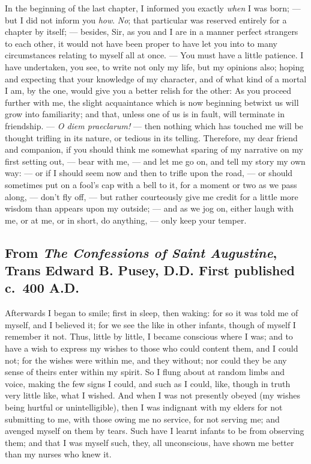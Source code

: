 \documentclass[
]{memoir}
\begin{document}
In the beginning of the last chapter, I informed you exactly \emph{when}
I was born; --- but I did not inform you \emph{how}. \emph{No}; that
particular was reserved entirely for a chapter by itself; --- besides,
Sir, as you and I are in a manner perfect strangers to each other, it
would not have been proper to have let you into to many circumstances
relating to myself all at once. --- You must have a little patience. I
have undertaken, you see, to write not only my life, but my opinions
also; hoping and expecting that your knowledge of my character, and of
what kind of a mortal I am, by the one, would give you a better relish
for the other: As you proceed further with me, the slight acquaintance
which is now beginning betwixt us will grow into familiarity; and that,
unless one of us is in fault, will terminate in friendship. --- \emph{O
diem praeclarum!} --- then nothing which has touched me will be thought
trifling in its nature, or tedious in its telling. Therefore, my dear
friend and companion, if you should think me somewhat sparing of my
narrative on my first setting out, --- bear with me, --- and let me go
on, and tell my story my own way: --- or if I should seem now and then
to trifle upon the road, --- or should sometimes put on a fool's cap
with a bell to it, for a moment or two as we pass along, --- don't fly
off, --- but rather courteously give me credit for a little more wisdom
than appears upon my outside; --- and as we jog on, either laugh with
me, or at me, or in short, do anything, --- only keep your temper.

\hypertarget{from-the-confessions-of-saint-augustine-trans-edward-b.-pusey-d.d.-first-published-c.-400-a.d.}{%
\subsection*{\texorpdfstring{From \emph{The Confessions of Saint
Augustine}, Trans Edward B. Pusey, D.D. First published c.~400
A.D.}{From The Confessions of Saint Augustine, Trans Edward B. Pusey, D.D. First published c.~400 A.D.}}\label{from-the-confessions-of-saint-augustine-trans-edward-b.-pusey-d.d.-first-published-c.-400-a.d.}}

Afterwards I began to smile; first in sleep, then waking: for so it was
told me of myself, and I believed it; for we see the like in other
infants, though of myself I remember it not. Thus, little by little, I
became conscious where I was; and to have a wish to express my wishes to
those who could content them, and I could not; for the wishes were
within me, and they without; nor could they be any sense of theirs enter
within my spirit. So I flung about at random limbs and voice, making the
few signs I could, and such as I could, like, though in truth very
little like, what I wished. And when I was not presently obeyed (my
wishes being hurtful or unintelligible), then I was indignant with my
elders for not submitting to me, with those owing me no service, for not
serving me; and avenged myself on them by tears. Such have I learnt
infants to be from observing them; and that I was myself such, they, all
unconscious, have shown me better than my nurses who knew it.
\end{document}
